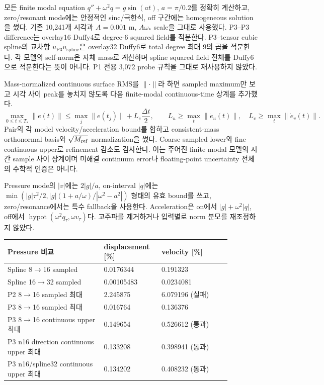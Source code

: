 \documentclass[10pt]{article}
\begin{document}
모든 finite modal equation \(q''+\omega^2q=g\sin(at)\), \(a=\pi/0.2\)를 정확히 계산하고,
zero/resonant mode에는 안정적인 sinc/극한식, off 구간에는 homogeneous solution을 썼다.
기존 10,241개 시각과 \(A=0.001\) m, \(A\omega_*\) scale을 그대로 사용했다.
P3--P3 difference는 overlay16 Duffy4로 degree-6 squared field를 적분한다.
P3--tensor cubic spline의 교차항 \(u_{\mathrm{P3}}u_{\mathrm{spline}}\)은
overlay32 Duffy6로 total degree 최대 9의 곱을 적분한다.
각 모델의 self-norm은 자체 mass로 계산하며 spline squared field 전체를 Duffy6으로 적분한다는 뜻이 아니다.
P1 전용 3,072 probe 규칙을 그대로 재사용하지 않았다.

Mass-normalized continuous surface RMS를 \(\|\cdot\|\)라 하면 sampled maximum만 보고
시각 사이 peak를 놓치지 않도록 다음 finite-modal continuous-time 상계를 추가했다.
\[
 \max_{0\le t\le T_*}\|e(t)\|
 \le \max_j\|e(t_j)\|+L_e\frac{\Delta t}{2},\qquad
 L_u\ge\max_t\|\dot e_u(t)\|,\quad L_v\ge\max_t\|\dot e_v(t)\|.
\]
Pair의 각 model velocity/acceleration bound를 합하고 consistent-mass orthonormal basis와
\(\sqrt{M_{\rm ref}}\) normalization을 썼다. Coarse sampled lower와 fine continuous upper로
refinement 감소도 검사한다. 이는 주어진 finite modal 모델의 시간 sample 사이 상계이며
미해결 continuum error나 floating-point uncertainty 전체의 수학적 인증은 아니다.

Pressure mode의 \(|v|\)에는 \(2|g|/a\), on-interval \(|q|\)에는
\(\min(|g|\tau^2/2, |g|(1+a/\omega)/|\omega^2-a^2|)\) 형태의 유효 bound를 쓰고,
zero/resonance에서는 특수 fallback을 사용한다. Acceleration은 on에서
\(|g|+\omega^2|q|\), off에서 \(\operatorname{hypot}(\omega^2q_\tau,\omega v_\tau)\)다.
고주파를 제거하거나 입력별로 norm 분모를 재조정하지 않았다.

\begin{longtable}{L{0.39\linewidth}L{0.20\linewidth}L{0.29\linewidth}}
\toprule Pressure 비교 & displacement [\%] & velocity [\%]\\\midrule
Spline 8$\to$16 sampled & 0.0176344 & 0.191323\\
Spline 16$\to$32 sampled & 0.00105483 & 0.0234081\\
P2 8$\to$16 sampled 최대 & 2.245875 & 6.079196 (실패)\\
P3 8$\to$16 sampled 최대 & 0.016764 & 0.136376\\
P3 8$\to$16 continuous upper 최대 & 0.149654 & 0.526612 (통과)\\
P3 n16 direction continuous upper 최대 & 0.133208 & 0.398941 (통과)\\
P3 n16/spline32 continuous upper 최대 & 0.134202 & 0.408232 (통과)\\
\bottomrule\end{longtable}
\end{document}
